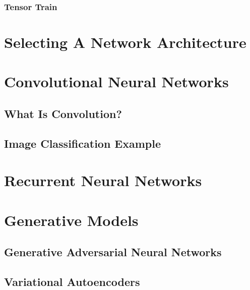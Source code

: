 \documentclass{article}
\begin{document}
\subsubsection{Tensor Train}

\section{Selecting A Network Architecture}

\section{Convolutional Neural Networks}

\subsection{What Is Convolution?}


\subsection{Image Classification Example}

\section{Recurrent Neural Networks}

\section{Generative Models}

\subsection{Generative Adversarial Neural Networks}

\subsection{Variational Autoencoders}
\end{document}
